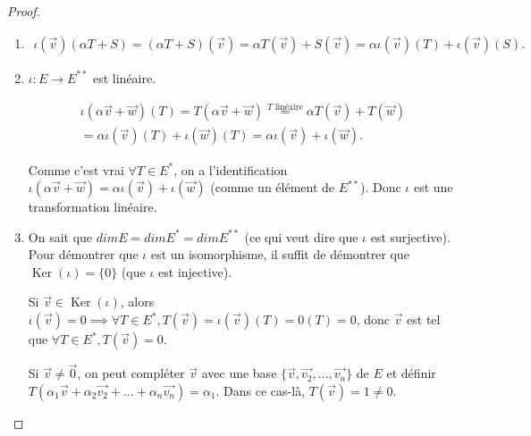 \documentclass[french]{article}
\begin{document}
\begin{proof}

  \

  \begin{enumerate}
    \item \begin{gather*}
      \iota(\overrightarrow{ v } ) (\alpha T+ S) = (\alpha T+S)(\overrightarrow{ v } ) = \alpha T(\overrightarrow{ v } )+ S(\overrightarrow{ v } ) = \alpha \iota(\overrightarrow{ v } )(T)+ \iota(\overrightarrow{ v } )(S).
  \end{gather*}
    \item $\iota : E \to E ^{**}$ est linéaire.

    \begin{gather*}
      \iota(\alpha \overrightarrow{ v } + \overrightarrow{ w }  )(T) = T(\alpha \overrightarrow{ v } + \overrightarrow{ w } ) \stackrel{T \text{ linéaire} }{=} \alpha T(\overrightarrow{ v } )+ T(\overrightarrow{ w } ) \\
      = \alpha \iota(\overrightarrow{ v } )(T)+ \iota(\overrightarrow{ w } ) (T) = \alpha \iota (\overrightarrow{ v } )+ \iota(\overrightarrow{ w }).
    \end{gather*}

    Comme c'est vrai $\forall T \in E ^{*}$, on a l'identification $\iota(\alpha \overrightarrow{ v }+ \overrightarrow{ w }  ) = \alpha \iota(\overrightarrow{ v } )+ \iota(\overrightarrow{ w } )$ (comme un élément de $E ^{**}$). Donc $\iota$ est une transformation linéaire.

    \item On sait que $dim E = dim E ^{*} = dim E ^{**}$ (ce qui veut dire que $\iota$ est surjective). Pour démontrer que $\iota$ est un isomorphisme, il suffit de démontrer que $\operatorname{Ker}(\iota) = \{ 0 \} $ (que $\iota$ est injective).

    Si $\overrightarrow{ v }  \in \operatorname{Ker}(\iota)$, alors $\iota(\overrightarrow{ v } ) = 0 \implies \forall T \in E ^{*}, T(\overrightarrow{ v } ) = \iota(\overrightarrow{ v })(T) = 0(T) =0$, donc $\overrightarrow{ v } $ est tel que $\forall T \in E ^{*}, T(\overrightarrow{ v } ) =0$.

    Si $\overrightarrow{ v } \neq \overrightarrow{ 0 }  $, on peut compléter $\overrightarrow{ v } $ avec une base $\{ \overrightarrow{ v }, \overrightarrow{ v_2 },\dots, \overrightarrow{ v_n } \} $ de $E$ et définir $T(\alpha_1 \overrightarrow{ v } + \alpha_2 \overrightarrow{ v_2 } + \dots + \alpha_n \overrightarrow{ v_n }  ) = \alpha_1$. Dans ce cas-là, $T(\overrightarrow{ v } ) = 1 \neq 0$.


\end{enumerate}
\end{proof}
\end{document}
